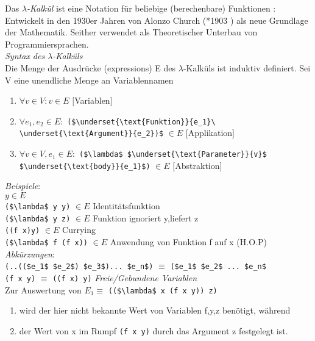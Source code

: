
Das \emph{$\lambda$-Kalkül} ist eine Notation für beliebige (berechenbare) Funktionen : Entwickelt in den 1930er Jahren von Alonzo Church (*1903  ) als neue Grundlage der Mathematik. Seither verwendet als Theoretischer Unterbau von Programmiersprachen.\\
\emph{Syntax des $\lambda$-Kalküls}\\
Die Menge der Ausdrücke (expressions) E des $\lambda$-Kalküls ist induktiv definiert. Sei V eine unendliche Menge an Variablennamen
\begin{enumerate}[-]
\item $\forall v \in V : v \in E$ \hfill $[$Variablen$]$
\item $\forall e_1,e_2 \in E:$ \lstinline[mathescape]|($\underset{\text{Funktion}}{e_1}\ \underset{\text{Argument}}{e_2})$| $\in E$ \hfill$[$Applikation$]$
\item $\forall v \in V, e_1 \in E :$ \lstinline[mathescape]|($\lambda$ $\underset{\text{Parameter}}{v}$ $\underset{\text{body}}{e_1}$)| $\in E$ \hfill $[$Abstraktion$]$
\end{enumerate}
\emph{Beispiele}:\\
$y \in E$\\
\lstinline[mathescape]|($\lambda$ y y)| $\in E$ Identitätsfunktion\\
\lstinline[mathescape]|($\lambda$ y z)| $\in E$ Funktion ignoriert y,liefert z\\
\lstinline[mathescape]|((f x)y)| $\in E$ Currying\\
\lstinline[mathescape]|($\lambda$ f (f x))| $\in E$ Anwendung von Funktion f auf x (H.O.P)\\
\emph{Abkürzungen}:\\
\lstinline[mathescape]|(..(($e_1$ $e_2$) $e_3$)... $e_n$)| $\equiv$ \lstinline[mathescape]|($e_1$ $e_2$ ... $e_n$|\\
\lstinline|(f x y)| $\equiv$ \lstinline|((f x) y)|
\emph{Freie/Gebundene Variablen}\\
Zur Auswertung von $E_1 \equiv$ \lstinline[mathescape]|(($\lambda$ x (f x y)) z)|
\begin{enumerate}[-]
\item wird der hier nicht bekannte Wert von Variablen f,y,z benötigt, während
\item der Wert von x im Rumpf \lstinline|(f x y)| durch das Argument z festgelegt ist.
\end{enumerate}
